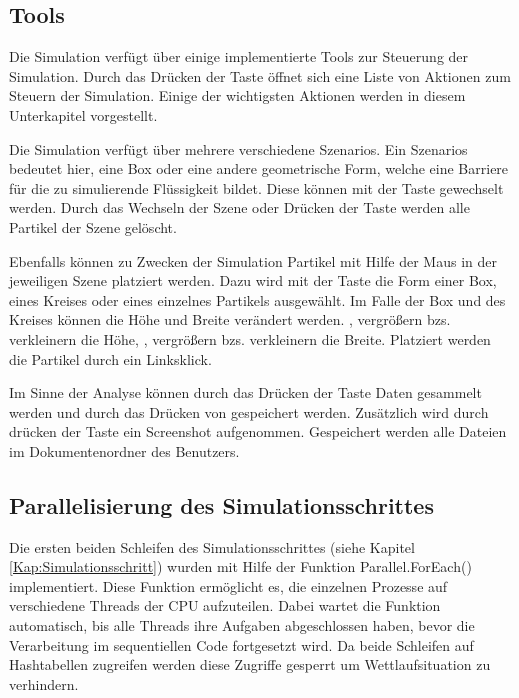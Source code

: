 \documentclass[a4paper, 12pt]{article}
\begin{document}
\subsection{Tools}
Die Simulation verfügt über einige implementierte Tools zur Steuerung der Simulation. Durch das Drücken der Taste  öffnet sich eine Liste von Aktionen zum Steuern der Simulation. Einige der wichtigsten Aktionen werden in diesem Unterkapitel vorgestellt. 

Die Simulation verfügt über mehrere verschiedene \glqq Szenarios\grqq{}. Ein \glqq Szenarios\grqq{} bedeutet hier, eine Box oder eine andere geometrische Form, welche eine Barriere für die zu simulierende Flüssigkeit bildet. Diese können mit der Taste  gewechselt werden. Durch das Wechseln der Szene oder Drücken der Taste  werden alle Partikel der Szene gelöscht. 

Ebenfalls können zu Zwecken der Simulation Partikel mit Hilfe der Maus in der jeweiligen Szene platziert werden. Dazu wird mit der Taste  die Form einer Box, eines Kreises oder eines einzelnes Partikels
ausgewählt. Im Falle der Box und des Kreises können die Höhe und Breite verändert werden. ,  vergrößern bzs. verkleinern die Höhe, , vergrößern bzs. verkleinern die Breite. Platziert werden die Partikel durch ein Linksklick.

Im Sinne der Analyse können durch das Drücken der Taste  Daten gesammelt werden und durch das Drücken von  gespeichert werden. Zusätzlich wird durch drücken der Taste  ein Screenshot aufgenommen. Gespeichert werden alle Dateien im Dokumentenordner des Benutzers.

\subsection{Parallelisierung des Simulationsschrittes}
Die ersten beiden Schleifen des Simulationsschrittes (siehe Kapitel \ref{Kap:Simulationsschritt}) wurden mit Hilfe der Funktion Parallel.ForEach() implementiert. Diese Funktion ermöglicht es, die einzelnen Prozesse auf verschiedene Threads der CPU aufzuteilen. Dabei wartet die Funktion automatisch, bis alle Threads ihre Aufgaben abgeschlossen haben, bevor die Verarbeitung im sequentiellen Code fortgesetzt wird. Da beide Schleifen auf Hashtabellen zugreifen werden diese Zugriffe gesperrt um Wettlaufsituation zu verhindern.  
\end{document}
